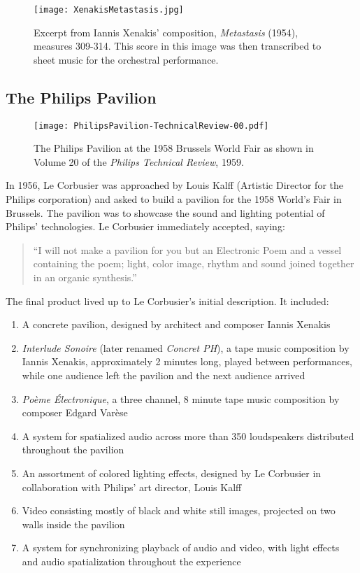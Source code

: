 \begin{figure*}[h]
  \texttt{[image: XenakisMetastasis.jpg]}
  \caption{Excerpt from Iannis Xenakis' composition,
    \textit{Metastasis} (1954), measures 309-314. This score in this
    image was then transcribed to sheet music for the orchestral
    performance.}
  \label{fig:metastasis}
\end{figure*}

\subsection{The Philips Pavilion}
\label{sec:philips-pavilion-1}
\begin{figure}[h]
  \texttt{[image: PhilipsPavilion-TechnicalReview-00.pdf]}
  \caption{The Philips Pavilion at the 1958 Brussels World Fair as
    shown in Volume 20 of the \textit{Philips Technical Review}, 1959.}
  \label{fig:philips-pavilion-photo}
\end{figure}
In 1956, Le Corbusier was approached by Louis Kalff (Artistic Director
for the Philips corporation) and asked to build a pavilion for the
1958 World's Fair in Brussels. The pavilion was to showcase the sound
and lighting potential of Philips' technologies. Le Corbusier
immediately accepted, saying:
\begin{quotation}
  ``I will not make a pavilion for you but an Electronic Poem and a
  vessel containing the poem; light, color image, rhythm and sound
  joined together in an organic synthesis.''\cite{Lopez2011} 
\end{quotation}
The final product lived up to Le Corbusier's initial description. It
included:\cite{Lombardo2009}
\begin{enumerate}
\item A concrete pavilion, designed by architect and composer Iannis
  Xenakis
\item \textit{Interlude Sonoire} (later renamed \textit{Concret PH}), a
  tape music composition by Iannis Xenakis, approximately 2 minutes
  long, played between performances, while one audience left the
  pavilion and the next audience arrived
\item \textit{Po\`{e}me \'{E}lectronique}, a three channel, 8 minute
  tape music composition by composer Edgard Var\`{e}se
\item A system for spatialized audio across more than 350 loudspeakers
  distributed throughout the pavilion
\item An assortment of colored lighting effects, designed by Le Corbusier in
  collaboration with Philips' art director, Louis Kalff
\item Video consisting mostly of black and white still images,
  projected on two walls inside the pavilion
\item A system for synchronizing playback of audio and video,
  with light effects and audio spatialization throughout the
  experience
\end{enumerate} 

